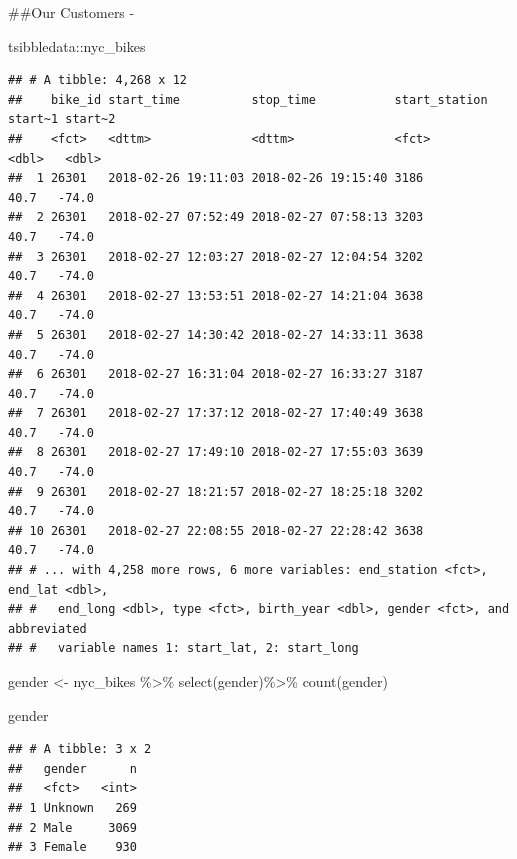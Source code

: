 \documentclass[
]{article}
\newenvironment{Shaded}{\begin{snugshade}}{\end{snugshade}}
\newcommand{\FunctionTok}[1]{\textcolor[rgb]{0.00,0.00,0.00}{#1}}
\newcommand{\NormalTok}[1]{#1}
\newcommand{\OtherTok}[1]{\textcolor[rgb]{0.56,0.35,0.01}{#1}}
\newcommand{\SpecialCharTok}[1]{\textcolor[rgb]{0.00,0.00,0.00}{#1}}
\begin{document}
\#\#Our Customers -

\begin{Shaded}
\begin{Highlighting}[]
\NormalTok{tsibbledata}\SpecialCharTok{::}\NormalTok{nyc\_bikes}
\end{Highlighting}
\end{Shaded}

\begin{verbatim}
## # A tibble: 4,268 x 12
##    bike_id start_time          stop_time           start_station start~1 start~2
##    <fct>   <dttm>              <dttm>              <fct>           <dbl>   <dbl>
##  1 26301   2018-02-26 19:11:03 2018-02-26 19:15:40 3186             40.7   -74.0
##  2 26301   2018-02-27 07:52:49 2018-02-27 07:58:13 3203             40.7   -74.0
##  3 26301   2018-02-27 12:03:27 2018-02-27 12:04:54 3202             40.7   -74.0
##  4 26301   2018-02-27 13:53:51 2018-02-27 14:21:04 3638             40.7   -74.0
##  5 26301   2018-02-27 14:30:42 2018-02-27 14:33:11 3638             40.7   -74.0
##  6 26301   2018-02-27 16:31:04 2018-02-27 16:33:27 3187             40.7   -74.0
##  7 26301   2018-02-27 17:37:12 2018-02-27 17:40:49 3638             40.7   -74.0
##  8 26301   2018-02-27 17:49:10 2018-02-27 17:55:03 3639             40.7   -74.0
##  9 26301   2018-02-27 18:21:57 2018-02-27 18:25:18 3202             40.7   -74.0
## 10 26301   2018-02-27 22:08:55 2018-02-27 22:28:42 3638             40.7   -74.0
## # ... with 4,258 more rows, 6 more variables: end_station <fct>, end_lat <dbl>,
## #   end_long <dbl>, type <fct>, birth_year <dbl>, gender <fct>, and abbreviated
## #   variable names 1: start_lat, 2: start_long
\end{verbatim}

\begin{Shaded}
\begin{Highlighting}[]
\NormalTok{gender }\OtherTok{\textless{}{-}}\NormalTok{ nyc\_bikes }\SpecialCharTok{\%\textgreater{}\%} 
  \FunctionTok{select}\NormalTok{(gender)}\SpecialCharTok{\%\textgreater{}\%}
 \FunctionTok{count}\NormalTok{(gender)}

\NormalTok{gender}
\end{Highlighting}
\end{Shaded}

\begin{verbatim}
## # A tibble: 3 x 2
##   gender      n
##   <fct>   <int>
## 1 Unknown   269
## 2 Male     3069
## 3 Female    930
\end{verbatim}
\end{document}
